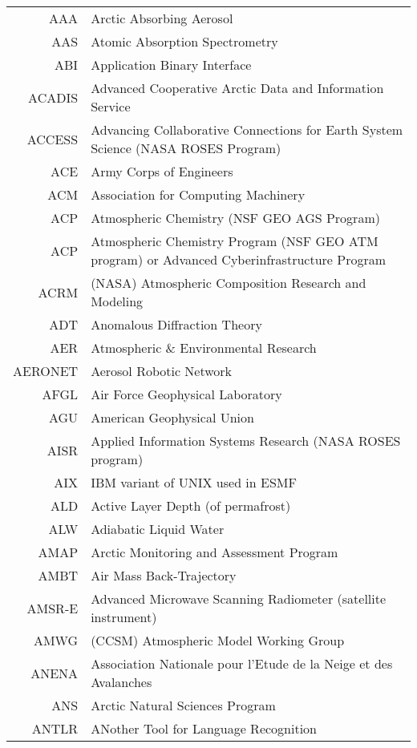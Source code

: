 \documentclass[12pt,twoside]{article}
\begin{document}
\begin{longtable}[>{\bfseries}l]{>{\ttfamily}r l}
AAA & Arctic Absorbing Aerosol \\
AAS & Atomic Absorption Spectrometry \\
ABI & Application Binary Interface \\
ACADIS & Advanced Cooperative Arctic Data and Information Service \\
ACCESS & Advancing Collaborative Connections for Earth System Science (NASA ROSES Program) \\
ACE & Army Corps of Engineers \\
ACM & Association for Computing Machinery \\
ACP & Atmospheric Chemistry (NSF GEO AGS Program) \\
ACP & Atmospheric Chemistry Program (NSF GEO ATM program) or Advanced Cyberinfrastructure Program \\
ACRM & (NASA) Atmospheric Composition Research and Modeling \\
ADT & Anomalous Diffraction Theory \\
AER & Atmospheric \& Environmental Research \\
AERONET & Aerosol Robotic Network \\
AFGL & Air Force Geophysical Laboratory \\
AGU & American Geophysical Union \\
AISR & Applied Information Systems Research (NASA ROSES program) \\
AIX & IBM variant of UNIX used in ESMF \\
ALD & Active Layer Depth (of permafrost) \\
ALW & Adiabatic Liquid Water \\
AMAP & Arctic Monitoring and Assessment Program \\
AMBT & Air Mass Back-Trajectory \\
AMSR-E & Advanced Microwave Scanning Radiometer (satellite instrument) \\
AMWG & (CCSM) Atmospheric Model Working Group \\
ANENA & Association Nationale pour l'Etude de la Neige et des Avalanches \\
ANS & Arctic Natural Sciences Program \\
ANTLR & ANother Tool for Language Recognition \\

\end{longtable}
\end{document}
